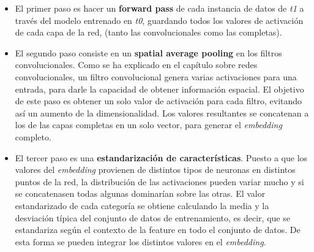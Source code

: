 \documentclass[12,twoside]{TFG-GM}
\theoremstyle{definition}
\theoremstyle{remark}
\begin{document}
\begin{itemize}
\item El primer paso es hacer un \textbf{forward pass} de cada instancia de datos de \textit{t1} a través del modelo entrenado en \textit{t0}, guardando todos los valores de activación de cada capa de la red, (tanto las convolucionales como las completas). 

\item El segundo paso consiste en un \textbf{spatial average pooling} en los filtros convolucionales. Como se ha explicado en el capítulo sobre redes convolucionales, un filtro convolucional genera varias activaciones para una entrada, para darle la capacidad de obtener información espacial.  El objetivo de este paso es obtener un solo valor de activación para cada filtro, evitando así un aumento de la dimensionalidad. Los valores resultantes se concatenan a los de las capas completas en un solo vector, para generar el \textit{embedding} completo.

\item El tercer paso es una \textbf{estandarización de características}. Puesto a que los valores del \textit{embedding} provienen de distintos tipos de neuronas en distintos puntos de la red, la distribución de las activaciones pueden variar mucho y si se concatenasen todas algunas dominarían sobre las otras. El valor estandarizado de cada categoría se obtiene calculando la media y la desviación típica del conjunto de datos de entrenamiento, es decir, que se estandariza según el contexto de la feature en todo el conjunto de datos. De esta forma se pueden integrar los distintos valores en el \textit{embedding}. 

\begin{figure}

\centering
{}
\caption{
\label{fig:caracterization}}
\end{figure}


\end{itemize}
\end{document}
